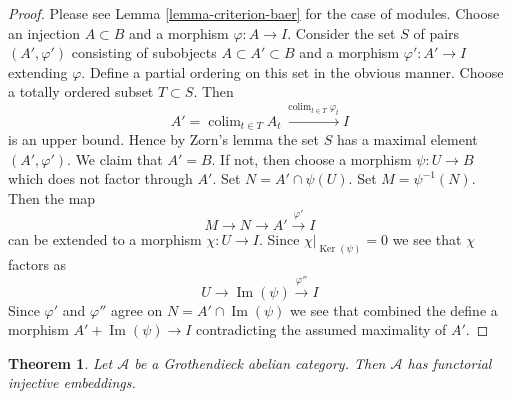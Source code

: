 \documentclass{stacks-project}
\theoremstyle{plain}
\newtheorem{theorem}[subsection]{Theorem}
\theoremstyle{definition}
\theoremstyle{remark}
\numberwithin{equation}{subsection}
\def\colim{\mathop{\mathrm{colim}}\nolimits}
\def\Ker{\mathop{\mathrm{Ker}}}
\def\Im{\mathop{\mathrm{Im}}}
\begin{document}
\begin{proof}
Please see Lemma \ref{lemma-criterion-baer} for the case of modules.
Choose an injection $A \subset B$ and a morphism $\varphi : A \to I$.
Consider the set $S$ of pairs $(A', \varphi')$ consisting of
subobjects $A \subset A' \subset B$ and a morphism $\varphi' : A' \to I$
extending $\varphi$. Define a partial ordering on this set in the obvious
manner. Choose a totally ordered subset $T \subset S$. Then
$$
A' = \colim_{t \in T} A_t \xrightarrow{\colim_{t \in T} \varphi_t} I
$$
is an upper bound. Hence by Zorn's lemma the set $S$ has a maximal element
$(A', \varphi')$. We claim that $A' = B$. If not, then choose a morphism
$\psi : U \to B$ which does not factor through $A'$. Set
$N = A' \cap \psi(U)$. Set $M = \psi^{-1}(N)$. Then the map
$$
M \to N \to A' \xrightarrow{\varphi'} I
$$
can be extended to a morphism $\chi : U \to I$. Since
$\chi|_{\Ker(\psi)} = 0$ we see that $\chi$ factors as
$$
U \to \Im(\psi) \xrightarrow{\varphi''} I
$$
Since $\varphi'$ and $\varphi''$ agree on $N = A' \cap \Im(\psi)$
we see that combined the define a morphism $A' + \Im(\psi) \to I$
contradicting the assumed maximality of $A'$.
\end{proof}

\begin{theorem}
\label{theorem-injective-embedding-grothendieck}
Let $\mathcal{A}$ be a Grothendieck abelian category.
Then $\mathcal{A}$ has functorial injective embeddings.
\end{theorem}
\end{document}
